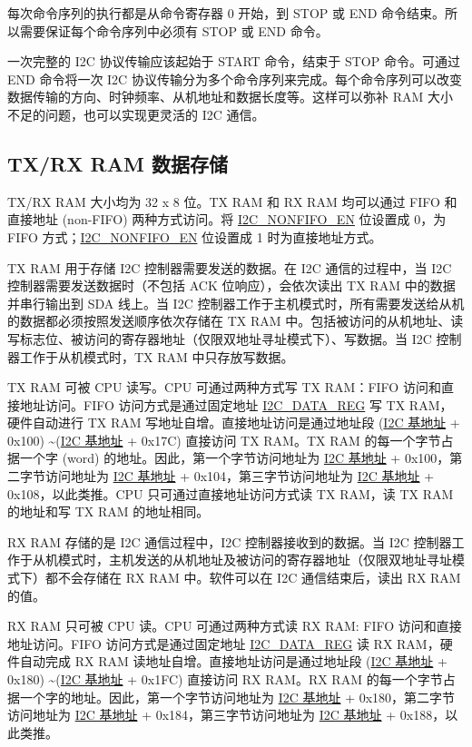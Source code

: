 \documentclass[main\_\_CN.tex]{subfiles}
\begin{document}
每次命令序列的执行都是从命令寄存器 0 开始，到 STOP 或 END 命令结束。所以需要保证每个命令序列中必须有 STOP 或 END 命令。

一次完整的 I2C 协议传输应该起始于 START 命令，结束于 STOP 命令。可通过 END 命令将一次 I2C 协议传输分为多个命令序列来完成。每个命令序列可以改变数据传输的方向、时钟频率、从机地址和数据长度等。这样可以弥补 RAM 大小不足的问题，也可以实现更灵活的 I2C 通信。

\subsection{TX/RX RAM 数据存储}
\label{subsubsec:i2c-txrx}
TX/RX RAM 大小均为 32 x 8 位。TX RAM 和 RX RAM 均可以通过 FIFO 和直接地址 (non-FIFO) 两种方式访问。将 \hyperref[fielddesc:I2CNONFIFOEN]{I2C\_NONFIFO\_EN} 位设置成 0，为 FIFO 方式；\hyperref[fielddesc:I2CNONFIFOEN]{I2C\_NONFIFO\_EN} 位设置成 1 时为直接地址方式。

TX RAM 用于存储 I2C 控制器需要发送的数据。在 I2C 通信的过程中，当 I2C 控制器需要发送数据时（不包括 ACK 位响应），会依次读出 TX RAM 中的数据并串行输出到 SDA 线上。当 I2C 控制器工作于主机模式时，所有需要发送给从机的数据都必须按照发送顺序依次存储在 TX RAM 中。包括被访问的从机地址、读写标志位、被访问的寄存器地址（仅限双地址寻址模式下）、写数据。当 I2C 控制器工作于从机模式时，TX RAM 中只存放写数据。

TX RAM 可被 CPU 读写。CPU 可通过两种方式写 TX RAM：FIFO 访问和直接地址访问。FIFO 访问方式是通过固定地址 \hyperref[regdesc:I2CDATAREG]{I2C\_DATA\_REG} 写 TX RAM，硬件自动进行 TX RAM 写地址自增。直接地址访问是通过地址段 (\hyperref[tab:sysmem-base-address]{I2C 基地址} + 0x{}100) \textasciitilde (\hyperref[tab:sysmem-base-address]{I2C 基地址} + 0x{}17C) 直接访问 TX RAM。TX RAM 的每一个字节占据一个字 (word) 的地址。因此，第一个字节访问地址为 \hyperref[tab:sysmem-base-address]{I2C 基地址} + 0x{}100，第二字节访问地址为 \hyperref[tab:sysmem-base-address]{I2C 基地址} + 0x{}104，第三字节访问地址为 \hyperref[tab:sysmem-base-address]{I2C 基地址} + 0x{}108，以此类推。CPU 只可通过直接地址访问方式读 TX RAM，读 TX RAM 的地址和写 TX RAM 的地址相同。

RX RAM 存储的是 I2C 通信过程中，I2C 控制器接收到的数据。当 I2C 控制器工作于从机模式时，主机发送的从机地址及被访问的寄存器地址（仅限双地址寻址模式下）都不会存储在 RX RAM 中。软件可以在 I2C 通信结束后，读出 RX RAM 的值。


RX RAM 只可被 CPU 读。CPU 可通过两种方式读 RX RAM: FIFO 访问和直接地址访问。FIFO 访问方式是通过固定地址 \hyperref[regdesc:I2CDATAREG]{I2C\_DATA\_REG} 读 RX RAM，硬件自动完成 RX RAM 读地址自增。直接地址访问是通过地址段 (\hyperref[tab:sysmem-base-address]{I2C 基地址} + 0x{}180) \textasciitilde (\hyperref[tab:sysmem-base-address]{I2C 基地址} + 0x{}1FC) 直接访问 RX RAM。RX RAM 的每一个字节占据一个字的地址。因此，第一个字节访问地址为 \hyperref[tab:sysmem-base-address]{I2C 基地址} + 0x{}180，第二字节访问地址为 \hyperref[tab:sysmem-base-address]{I2C 基地址} + 0x{}184，第三字节访问地址为 \hyperref[tab:sysmem-base-address]{I2C 基地址} + 0x{}188，以此类推。
\end{document}
